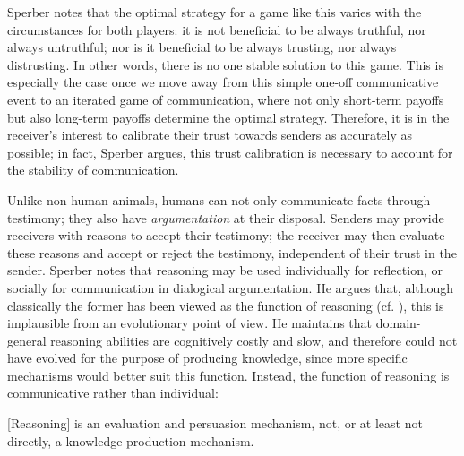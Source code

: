 Sperber notes that the optimal strategy for a game like this varies with the circumstances for both players: it is not beneficial to be always truthful, nor always untruthful; nor is it beneficial to be always trusting, nor always distrusting. In other words, there is no one stable solution to this game.
This is especially the case once we move away from this simple one-off communicative event to an iterated game of communication, where not only short-term payoffs but also long-term payoffs determine the optimal strategy.
Therefore, it is in the receiver's interest to calibrate their trust towards senders as accurately as possible; in fact, Sperber argues, this trust calibration is necessary to account for the stability of communication.

Unlike non-human animals, humans can not only communicate facts through testimony; they also have \emph{argumentation} at their disposal. Senders may provide receivers with reasons to accept their testimony; the receiver may then evaluate these reasons and accept or reject the testimony, independent of their trust in the sender.
Sperber notes that reasoning may be used individually for reflection, or socially for communication in dialogical argumentation. He argues that, although classically the former has been viewed as the function of reasoning (cf. \citet{Novaes20}), this is implausible from an evolutionary point of view. He maintains that domain-general reasoning abilities are cognitively costly and slow, and therefore could not have evolved for the purpose of producing knowledge, since more specific mechanisms would better suit this function. Instead, the function of reasoning is communicative rather than individual:
\begin{quoting}
    {[Reasoning]} is an evaluation and persuasion mechanism, not, or at least not directly, a knowledge-production mechanism.
    \hfill \citep[p.~409]{Sperber01}
\end{quoting}

